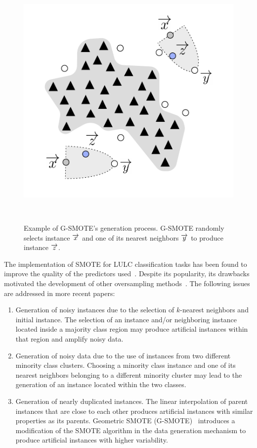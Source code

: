 \documentclass[preprint,12pt]{elsarticle}
\begin{document}
\begin{figure}[htb]
	\centering
	\includegraphics[width=.75\linewidth]{../analysis/data_generation}
    \caption{Example of G-SMOTE's generation process. G-SMOTE randomly selects
        instance $\protect\overrightarrow{x}$ and one of its nearest neighbors
        $\protect\overrightarrow{y}$ to produce instance
        $\protect\overrightarrow{z}$.
    }~\label{fig:data_generation}
\end{figure}

The implementation of SMOTE for LULC classification tasks has been found to
improve the quality of the predictors used~\cite{Jozdani2019,Bogner2018}.
Despite its popularity, its drawbacks motivated the development of other
oversampling methods~\cite{Douzas2019}. The following issues are addressed in
more recent papers:

\begin{enumerate}
    \item Generation of noisy instances due to the selection of $k$-nearest
        neighbors and initial instance. The selection of an instance and/or
        neighboring instance located inside a majority class region may
        produce artificial instances within that region and amplify noisy
        data.
    \item Generation of noisy data due to the use of instances from two
        different minority class clusters. Choosing a minority class instance
        and one of its nearest neighbors belonging to a different minority
        cluster may lead to the generation of an instance located within the
        two classes.
    \item Generation of nearly duplicated instances. The linear interpolation
        of parent instances that are close to each other produces artificial
        instances with similar properties as its parents. Geometric SMOTE
        (G-SMOTE)~\cite{Douzas2019} introduces a modification of the SMOTE
        algorithm in the data generation mechanism to produce artificial
        instances with higher variability.
\end{enumerate}
\end{document}
